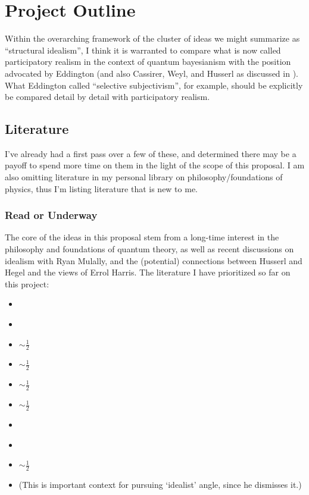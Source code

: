 \section{Project Outline}




Within the overarching framework of the cluster of ideas we might summarize as ``structural idealism'', I think it is warranted to compare what is now called participatory realism in the context of quantum bayesianism with the position advocated by Eddington (and also Cassirer, Weyl, and Husserl as discussed in \cite{Ryckman2005}).  What Eddington called ``selective subjectivism'', for example, should be explicitly be compared detail by detail with participatory realism. 


\subsection{Literature}

I've already had a first pass over a few of these, and determined there may be a payoff to spend more time on them in the light of the scope of this proposal.  I am also omitting literature in my personal library on philosophy/foundations of physics, thus I'm listing literature that is new to me. 

\subsubsection{Read or Underway}

The core of the ideas in this proposal stem from a long-time interest in the philosophy and foundations of quantum theory, as well as recent discussions on idealism with Ryan Mulally, and the (potential) connections between Husserl and Hegel and the views of Errol Harris.  The literature I have prioritized so far on this project:

\begin{itemize}
    \item \cite{Poincare1952} \checkmark
    \item \cite{Eddington1939} \checkmark
    \item \cite{Ryckman2005} $\sim \frac{1}{2}$
    \item \cite{Harris1965} $\sim \frac{1}{2}$
    \item \cite{Weyl1949} $\sim \frac{1}{2}$
    \item \cite{Cassirer1927} $\sim \frac{1}{2}$
    \item \cite{Riezler1940} \checkmark
    \item \cite{Carnap1966} \checkmark
    \item \cite{KantProlegomena} $\sim \frac{1}{2}$
    \item \cite{Psillos2001} \checkmark (This is important context for pursuing `idealist' angle, since he dismisses it.)
\end{itemize}


